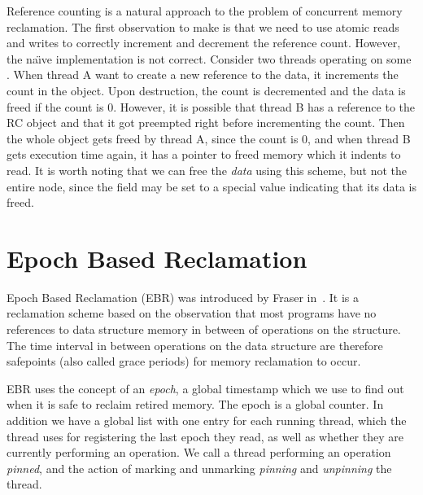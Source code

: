 \documentclass[a4paper,twoside]{report}
\begin{document}
 Reference counting
is a natural approach to the problem of concurrent memory reclamation.  The
first observation to make is that we need to use atomic reads and writes to
correctly increment and decrement the reference count. However, the na\"\i{}ve
implementation is not correct.  Consider two threads operating on some
.  When thread A want to create a new reference to the data, it
increments the count in the  object. Upon destruction, the count is
decremented and the data is freed if the count is 0.  However, it is possible
that thread B has a reference to the RC object and that it got preempted right
before incrementing the count.  Then the whole object gets freed by thread A,
since the count is 0, and when thread B gets execution time again, it has a
pointer to freed memory which it indents to read.  It is worth noting that we
can free the \emph{data} using this scheme, but not the entire  node,
since the  field may be set to a special value indicating that its
data is freed.



%

\section{Epoch Based Reclamation}
Epoch Based Reclamation (EBR) was introduced by Fraser
in~\cite{fraser2004practical}.  It is a reclamation scheme based on the
observation that most programs have no references to data structure memory in
between of operations on the structure.  The time interval in between
operations on the data structure are therefore safepoints (also called grace
periods) for memory reclamation to occur.  

EBR uses the concept of an \emph{epoch}, a global timestamp which we use to
find out when it is safe to reclaim retired memory.  The epoch is a global
counter.  In addition we have a global list with one entry for each running
thread, which the thread uses for registering the last epoch they read, as well
as whether they are currently performing an operation.  We call a thread
performing an operation \emph{pinned}, and the action of marking and unmarking
\emph{pinning} and \emph{unpinning} the thread.
\end{document}
